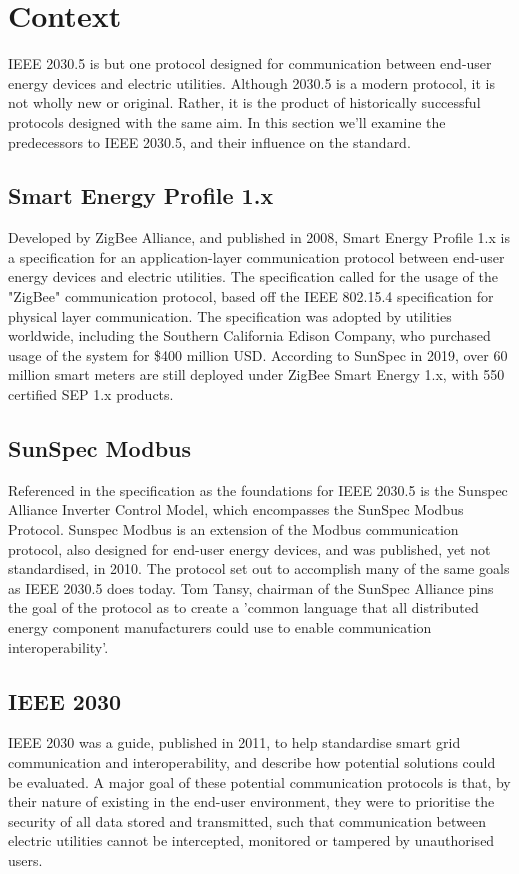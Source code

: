 \chapter{Context}\label{ch:context}

IEEE 2030.5 is but one protocol designed for communication between end-user energy devices and electric utilities. 
Although 2030.5 is a modern protocol, it is not wholly new or original. Rather, it is the product of historically successful protocols designed with the same aim.
In this section we'll examine the predecessors to IEEE 2030.5, and their influence on the standard.

\section{Smart Energy Profile 1.x}
Developed by ZigBee Alliance, and published in 2008, Smart Energy Profile 1.x is a specification for an application-layer communication protocol between end-user energy devices and electric utilities. 
The specification called for the usage of the "ZigBee" communication protocol, based off the IEEE 802.15.4 specification for physical layer communication. \cite[]{ZigBeeSEP} \hfill \break
The specification was adopted by utilities worldwide, including the Southern California Edison Company, who purchased usage of the system for \$400 million USD. \cite[]{SEP1Article} \hfill \break
According to SunSpec in 2019, over 60 million smart meters are still deployed under ZigBee Smart Energy 1.x, with 550 certified SEP 1.x products. \cite[]{20305workshop}


\section{SunSpec Modbus}
Referenced in the specification as the foundations for IEEE 2030.5 is the Sunspec Alliance Inverter Control Model, which encompasses the SunSpec Modbus Protocol.
Sunspec Modbus is an extension of the Modbus communication protocol, also designed for end-user energy devices, and was published, yet not standardised, in 2010. The protocol set out to accomplish many of the same goals as IEEE 2030.5 does today. 
Tom Tansy, chairman of the SunSpec Alliance pins the goal of the protocol as to create a 'common language that all distributed energy component manufacturers could use to enable communication interoperability'.
\cite[]{SunspecModbusArticle}

\section{IEEE 2030}
IEEE 2030 was a guide, published in 2011, to help standardise smart grid communication and interoperability, and describe how potential solutions could be evaluated. A major goal of these potential communication protocols is that, by their nature of existing in the end-user environment, they were to prioritise the security of all data stored and transmitted, such that communication between electric utilities cannot be intercepted, monitored or tampered by unauthorised users.


